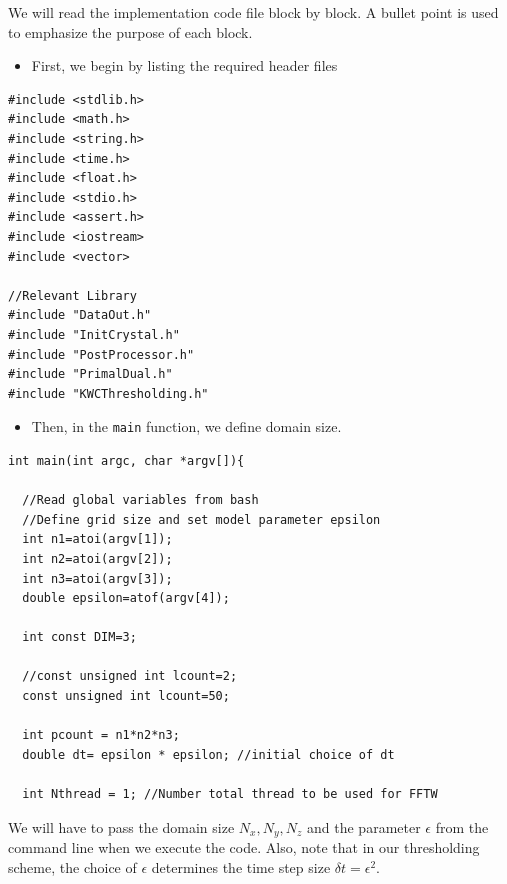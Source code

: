 \documentclass[11pt]{article}
\begin{document}
We will read the implementation code file block by block. 
A bullet point is used to emphasize the purpose of each block.  

\begin{itemize} \item First, we begin by listing the required header files \end{itemize}
\begin{tcolorbox}
\begin{lstlisting}[basicstyle=\footnotesize]
#include <stdlib.h>
#include <math.h>
#include <string.h>
#include <time.h>
#include <float.h>
#include <stdio.h>
#include <assert.h>
#include <iostream>
#include <vector>

//Relevant Library
#include "DataOut.h"
#include "InitCrystal.h"
#include "PostProcessor.h"
#include "PrimalDual.h"
#include "KWCThresholding.h"
\end{lstlisting}
\end{tcolorbox}

\begin{itemize} \item Then, in the \texttt{main} function, 
we define domain size. \end{itemize}

\begin{tcolorbox}
\begin{lstlisting}[basicstyle=\footnotesize]
int main(int argc, char *argv[]){

  //Read global variables from bash
  //Define grid size and set model parameter epsilon
  int n1=atoi(argv[1]);
  int n2=atoi(argv[2]);
  int n3=atoi(argv[3]);
  double epsilon=atof(argv[4]);

  int const DIM=3;
      
  //const unsigned int lcount=2;
  const unsigned int lcount=50;
    
  int pcount = n1*n2*n3;
  double dt= epsilon * epsilon; //initial choice of dt
	
  int Nthread = 1; //Number total thread to be used for FFTW	

\end{lstlisting}
\end{tcolorbox}

We will have to pass the domain size $N_x,N_y,N_z$
and the parameter $\epsilon$ 
from the command line when we execute the code. 
Also, note that in our thresholding scheme, 
the choice of $\epsilon$ determines the time step size $\delta t =\epsilon^2$.
\end{document}
